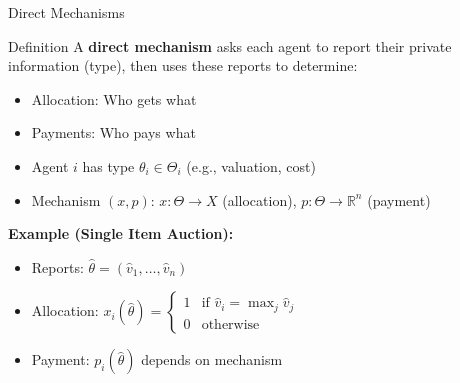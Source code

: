 \documentclass[xcolor={x11names}, aspectratio=169 ]{beamer}
\begin{document}
\begin{frame}{Direct Mechanisms}
\begin{block}{Definition}
A \textbf{direct mechanism} asks each agent to report their private information (type), then uses these reports to determine:
\begin{itemize}
  \item Allocation: Who gets what
  \item Payments: Who pays what
\end{itemize}
\end{block}

\begin{itemize}
  \item Agent $i$ has type $\theta_i \in \Theta_i$ (e.g., valuation, cost)
  \item Mechanism $(x, p)$: $x: \Theta \to X$ (allocation), $p: \Theta \to \mathbb{R}^n$ (payment)
\end{itemize}

\textbf{Example (Single Item Auction):}
\begin{itemize}
  \item Reports: $\hat{\theta} = (\hat{v}_1, \ldots, \hat{v}_n)$
  \item Allocation: $x_i(\hat{\theta}) = \begin{cases} 1 & \text{if } \hat{v}_i = \max_j \hat{v}_j \\ 0 & \text{otherwise} \end{cases}$
  \item Payment: $p_i(\hat{\theta})$ depends on mechanism
\end{itemize}
\end{frame}
\end{document}
